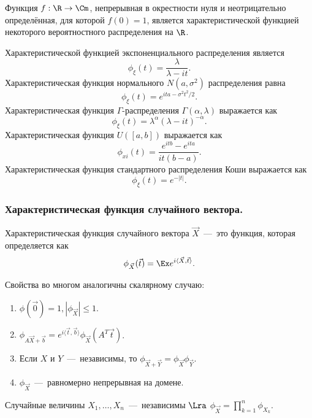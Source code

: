 \begin{theorem}
    Функция $f: \R \to \Cm$, непрерывная в окрестности нуля и неотрицательно определённая, для которой $f(0) = 1$, является характеристической функцией некоторого вероятностного распределения на $\R$.
\end{theorem}
\begin{example}
    Характеристической функцией экспоненциального распределения является
    \[
        \phi_{\xi}(t) = \dfrac{\lambda}{\lambda - it}.
    \]
    Характеристическая функция нормального $N(a, \sigma^2)$ распределения равна
    \[
        \phi_{\xi}(t) = e^{ita - \sigma^2t^2/2}.
    \]
    Характеристическая функция $\Gamma$-распределения $\Gamma(\alpha, \lambda)$ выражается как
    \[
        \phi_{\xi}(t) = \lambda^{\alpha}(\lambda - it)^{-\alpha}.
    \]
    Характеристическая функция $U([a, b])$ выражается как
    \[
        \phi_{xi}(t) = \dfrac{e^{itb} - e^{ita}}{it(b - a)}.
    \]
    Характеристическая функция стандартного распределения Коши выражается как
    \[
        \phi_{\xi}(t) = e^{-|t|}.
    \]
\end{example}
\subsubsection{Характеристическая функция случайного вектора.}
\begin{definition}
    Характеристическая функция случайного вектора $\vec{X}$~---~это функция, которая определяется как
    \[
        \phi_{\vec{X}}(\vec{t}) = \Ex e^{i\langle \vec{X}, \vec{t} \rangle}.
    \]
\end{definition}
\begin{proposition}
    Свойства во многом аналогичны скалярному случаю:
    \begin{enumerate}
        \item $\phi(\vec{0}) = 1, |\phi_{\vec{X}}| \leq 1$.
        \item $\phi_{A\vec{X} + \vec{b}} = e^{i\langle \vec{t}, \vec{b} \rangle}\phi_{\vec{X}}(A^T \vec{t})$.
        \item Если $X$ и $Y$~---~независимы, то $\phi_{\vec{X} + \vec{Y}} = \phi_{\vec{X}}\phi_{\vec{Y}}$.
        \item $\phi_{\vec{X}}$~---~равномерно непрерывная на домене.
    \end{enumerate}
\end{proposition}
\begin{proposition}
    Случайные величины $X_1, \ldots, X_n$~---~независимы $\Lra$ $\phi_{\vec{X}} = \prod\limits_{k = 1}^n \phi_{X_k}$.
\end{proposition}